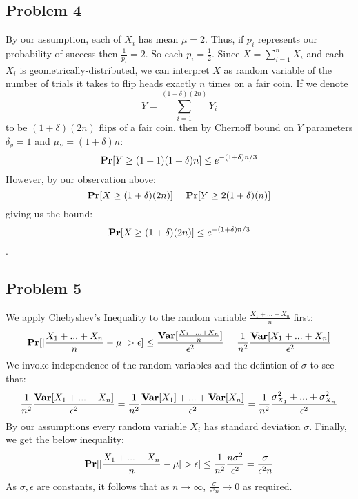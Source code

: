 \documentclass[12pt]{article}%
\begin{document}
\subsection*{Problem 4}
By our assumption, each of $X_i$ has mean $\mu = 2$. Thus, if $p_i$ represents our probability of success then $\frac{1}{p_i} = 2$. So each $p_i = \frac{1}{2}$. Since $X = \sum_{i=1}^n X_i$ and each $X_i$ is geometrically-distributed, we can interpret $X$ as random variable of the number of trials it takes to flip heads exactly $n$ times on a fair coin. If we denote
$$Y = \sum_{i=1}^{(1+\delta)(2n)} Y_i$$ to be $(1+\delta)(2n)$ flips of a fair coin, then by Chernoff bound  on $Y$ parameters $\delta_y = 1$ and $\mu_Y = (1 + \delta)n$:
$${\bf Pr}[Y \geq (1+1)(1+\delta)n] \leq e^{-(1+\delta)n/3}$$
However, by our observation above:
$${\bf Pr}[X \geq (1+\delta)(2n)] = {\bf Pr}[Y \geq 2(1+\delta)(n)]$$ giving us the bound:
$${\bf Pr}[X \geq (1+\delta)(2n)] \leq e^{-(1+\delta)n/3} $$.

\subsection*{Problem 5}
We apply Chebyshev's Inequality to the random variable $\frac{X_1+...+ X_n}{n}$ first:
$$ {\bf Pr}[|\frac{X_1+...+ X_n}{n} - \mu| > \epsilon] \leq \frac{{\bf Var}[\frac{X_1+...+ X_n}{n}]}{\epsilon^2} = \frac{1}{n^2}\frac{{\bf Var}[X_1+...+ X_n]}{\epsilon^2} $$
We invoke independence of the random variables and the defintion of $\sigma$ to see that:
$$\frac{1}{n^2}\frac{{\bf Var}[X_1+...+ X_n]}{\epsilon^2} = \frac{1}{n^2}\frac{{\bf Var}[X_1]+...+ {\bf Var}[X_n]}{\epsilon^2} = \frac{1}{n^2}\frac{\sigma_{X_1}^2 +...+ \sigma_{X_n}^2} {\epsilon^2}$$
By our assumptions every random variable $X_i$ has standard deviation $\sigma$. Finally, we get the below inequality:
$${\bf Pr}[|\frac{X_1+...+ X_n}{n} - \mu| > \epsilon] \leq  \frac{1}{n^2}\frac{n\sigma^2}{\epsilon^2} = \frac{\sigma}{\epsilon^2 n}$$
As $\sigma,\epsilon$ are constants, it follows that as $n \rightarrow \infty$, $\frac{\sigma}{\epsilon^2 n} \rightarrow 0$ as required.
\end{document}
